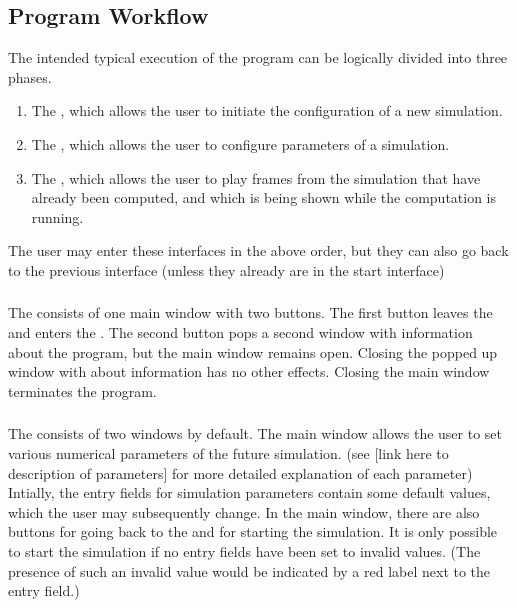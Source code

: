 \documentclass{article}
\newcommand{\vxlisp}{\vspace*{12pt}}
\begin{document}
\subsection{Program Workflow}
The intended typical execution of the program can be logically divided into three phases.
\begin{enumerate}
	\item The \hyperref[sec:i0]{\inull}, which allows the user to initiate the configuration of a new simulation.
	\item The \hyperref[sec:i1]{\ione}, which allows the user to configure parameters of a simulation.
	\item The \hyperref[sec:i2]{\itwo}, which allows the user to play frames from the simulation that have already been computed, and which is being shown while the computation is running.
\end{enumerate}
The user may enter these interfaces in the above order, but they can also go back to the previous interface (unless they already are in the start interface)

\subsubsection{\Inull}\label{sec:i0}
The \inull{} consists of one main window with two buttons. The first button leaves the \inull{} and enters the \ione. The second button pops a second window with information about the program, but the main window remains open. Closing the popped up window with about information has no other effects. Closing the main window terminates the program.


\subsubsection{\Ione}\label{sec:i1}

The \ione{} consists of two windows by default. The main window allows the user to set various numerical parameters of the future simulation. (see [link here to description of parameters] for more detailed explanation of each parameter) Intially, the entry fields for simulation parameters contain some default values, which the user may subsequently change. In the main window, there are also buttons for going back to the \inull{} and for starting the simulation. It is only possible to start the simulation if no entry fields have been set to invalid values. (The presence of such an invalid value would be indicated by a red label next to the entry field.)
\vxlisp
\end{document}
